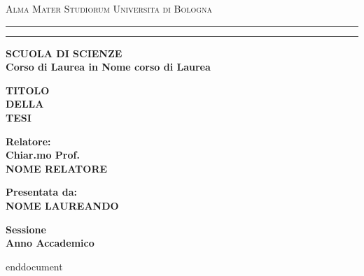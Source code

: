 \begin{titlepage}
    \begin{center}
        {{\Large{\textsc{Alma Mater Studiorum  Universita di
                        Bologna}}}} \rule[0.1cm]{15.8cm}{0.1mm}
        \rule[0.5cm]{15.8cm}{0.6mm}
        {\small{\bf SCUOLA DI SCIENZE\\
                Corso di Laurea in Nome corso di Laurea }}
    \end{center}
    \vspace{15mm}
    \begin{center}
        {\LARGE{\bf TITOLO}}\\
        \vspace{3mm}
        {\LARGE{\bf DELLA}}\\
        \vspace{3mm}
        {\LARGE{\bf TESI}}\\
    \end{center}
    \vspace{40mm}
    \par
    \noindent
    \begin{minipage}[t]{0.47\textwidth}
        {\large{\bf Relatore:\\
                Chiar.mo Prof.\\
                NOME RELATORE}}
    \end{minipage}
    \hfill
    \begin{minipage}[t]{0.47\textwidth}\raggedleft
        {\large{\bf Presentata da:\\
                NOME LAUREANDO}}
    \end{minipage}
    \vspace{20mm}
    \begin{center}
        {\large{\bf Sessione\\%
                Anno Accademico }}%
    \end{center}
\end{titlepage}
end{document}

